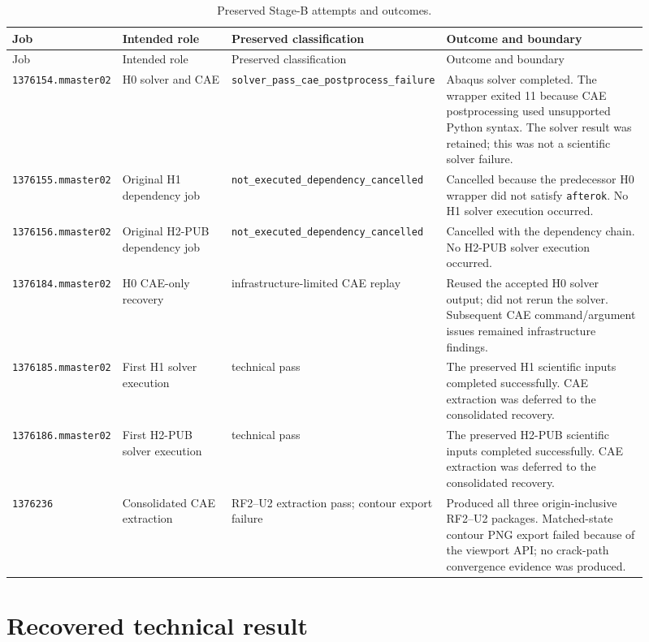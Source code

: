 \documentclass[11pt,a4paper]{article}
\begin{document}
\begin{longtable}{@{}p{0.14\linewidth}p{0.18\linewidth}p{0.25\linewidth}p{0.34\linewidth}@{}}
\caption{Preserved Stage-B attempts and outcomes.}\\
\toprule
Job & Intended role & Preserved classification & Outcome and boundary \\
\midrule
\endfirsthead
\toprule
Job & Intended role & Preserved classification & Outcome and boundary \\
\midrule
\endhead
\texttt{1376154.mmaster02} & H0 solver and CAE &
\texttt{solver\_pass\_cae\_postprocess\_failure} &
Abaqus solver completed.  The wrapper exited 11 because CAE postprocessing
used unsupported Python syntax.  The solver result was retained; this was not
a scientific solver failure. \\
\texttt{1376155.mmaster02} & Original H1 dependency job &
\texttt{not\_executed\_dependency\_cancelled} &
Cancelled because the predecessor H0 wrapper did not satisfy
\texttt{afterok}.  No H1 solver execution occurred. \\
\texttt{1376156.mmaster02} & Original H2-PUB dependency job &
\texttt{not\_executed\_dependency\_cancelled} &
Cancelled with the dependency chain.  No H2-PUB solver execution occurred. \\
\texttt{1376184.mmaster02} & H0 CAE-only recovery &
infrastructure-limited CAE replay &
Reused the accepted H0 solver output; did not rerun the solver.  Subsequent
CAE command/argument issues remained infrastructure findings. \\
\texttt{1376185.mmaster02} & First H1 solver execution &
technical pass &
The preserved H1 scientific inputs completed successfully.  CAE extraction
was deferred to the consolidated recovery. \\
\texttt{1376186.mmaster02} & First H2-PUB solver execution &
technical pass &
The preserved H2-PUB scientific inputs completed successfully.  CAE
extraction was deferred to the consolidated recovery. \\
\texttt{1376236} & Consolidated CAE extraction &
RF2--U2 extraction pass; contour export failure &
Produced all three origin-inclusive RF2--U2 packages.  Matched-state contour
PNG export failed because of the viewport API; no crack-path convergence
evidence was produced. \\
\bottomrule
\end{longtable}

\section{Recovered technical result}
\end{document}
